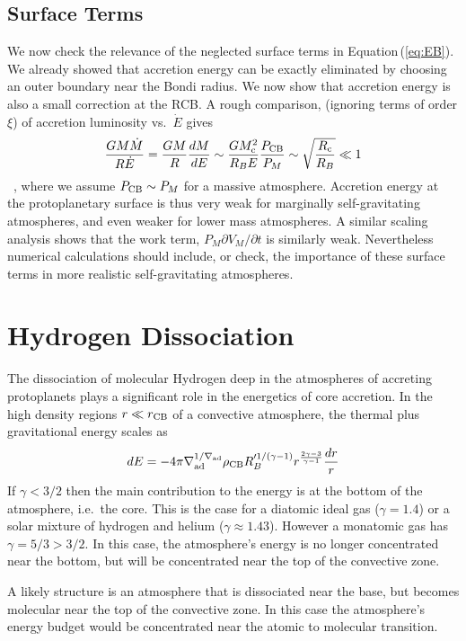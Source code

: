 \documentclass[12pt, preprint,numberedappendix]{emulateapj}
\newcommand{\p}{\partial}
\newcommand{\Eq}[1]{Equation\,(\ref{#1})}
\newcommand{\co}{_{\rm c}}
\newcommand{\cb}{_{\rm CB}}
\newcommand{\surf}{_M}
\begin{document}
\subsection{Surface Terms}
We now check the relevance of the neglected surface terms in \Eq{eq:EB}.  We already showed that accretion energy can be exactly eliminated by choosing an outer boundary near the Bondi radius.   We now show that accretion energy is also a small correction at the RCB.   A rough comparison, (ignoring terms of order $\xi$) of  accretion luminosity vs.\ $\dot{E}$ gives
\begin{equation}
{G M \dot{M} \over R \dot{E}} = {G M  \over R}{dM \over dE} \sim {G M\co^2 \over R_B E}{P\cb \over P_M} \sim \sqrt{R\co \over R_B} \ll 1
\end{equation} \, ,
where we assume $P\cb \sim P_M$  for a massive atmosphere.  Accretion energy at the protoplanetary surface is thus very weak for marginally self-gravitating atmospheres, and even weaker for lower mass atmospheres.  A similar scaling analysis shows that the work term, $P\surf \p V\surf/\p t$ is similarly weak.  Nevertheless numerical calculations should include, or check, the importance of these surface terms in more realistic self-gravitating atmospheres.


\section{Hydrogen Dissociation}
The dissociation of molecular Hydrogen deep in the atmospheres of accreting protoplanets plays a significant role in the energetics of core accretion.  In the high density regions $r  \ll r\cb$ of a convective atmosphere, the thermal plus gravitational energy scales as
\begin{equation}
dE = -4 \pi \nabla_{\rm ad}^{1/\nabla_{\rm ad}} \rho\cb R_B'^{1/(\gamma-1)} r^{\frac{2\gamma - 3}{\gamma - 1}} {dr \over r}
\end{equation} 
If $\gamma < 3/2$ then the main contribution to the energy is at the bottom of the atmosphere, i.e.\ the core.  This is the case for a diatomic ideal gas ($\gamma = 1.4$) or a solar mixture of hydrogen and helium ($\gamma \approx 1.43$).  However a monatomic gas has $\gamma = 5/3 > 3/2$.  In this case, the atmosphere's energy is no longer concentrated near the bottom, but will be concentrated near the top of the convective zone.

A likely structure is an atmosphere that is dissociated near the base, but becomes molecular near the top of the convective zone.  In this case the atmosphere's energy budget would be concentrated near the atomic to molecular transition.
\end{document}
